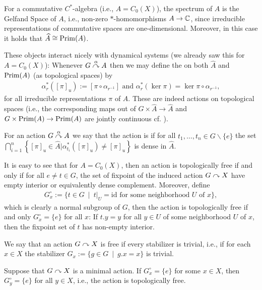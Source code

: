 \begin{remark}
	For a commutative $C^*$-algebra (i.e., $A = C_0(X)$), the spectrum of $A$ is the Gelfand Space of $A$, i.e., non-zero $*$-homomorphisms $A \to \mathbb{C}$, since irreducible representations of commutative spaces are one-dimensional. Moreover, in this case it holds that $\widehat{A} \cong \mathrm{Prim}(A)$.
\end{remark}
These objects interact nicely with dynamical systems (we already saw this for $A= C_0(X)$): Whenever $G \stackrel{\alpha}{\curvearrowright} A$ then we may define the  on both $\hat A$ and $\mathrm{Prim}(A)$ (as topological spaces) by
\begin{align*}
	\alpha_r^*([\pi]_u) := [\pi \circ \alpha_{r^{-1}}] \text{ and } \alpha_{r}^*(\ker \pi) = \ker \pi \circ \alpha_{r^{-1}},
\end{align*}
for all irreducible representations $\pi$ of $A$. These are indeed actions on topological spaces (i.e., the corresponding maps out of $G \times \hat A \to \hat A$ and $G \times \mathrm{Prim}(A) \to \mathrm{Prim}(A)$ are jointly continuous cf. \cite[Lemma 7.1]{williamsmorita}).
\begin{definition}
	For an action $G \stackrel{\alpha}{\curvearrowright} A$ we say that the action is  if for all $t_1,\dots,t_n \in G\backslash\{e\}$ the set $\bigcap_{i=1}^n \left\{ [\pi]_u \in \hat A | \alpha_{t_i}^*([\pi]_u)\neq [\pi]_u \right\}$ is dense in $\hat A$.
\end{definition}
\begin{remark}
	It is easy to see that for $A=C_0(X)$, then an action is topologically free if and only if for all $e \neq t \in G$, the set of fixpoint of the induced action $G \stackrel{}{\curvearrowright} X$ have empty interior or equivalently dense complement. Moreover, define 
	\begin{align*}
		G_x^\circ := \{t \in G \ \mid \ t|_U = \mathrm{id} \text{ for some neighborhood } U \text{ of } x\},
	\end{align*}
	which is clearly a normal subgroup of $G$, then the action is topologically free if and only $G_x^\circ = \{e\}$ for all $x$: If $t.y= y$ for all $y \in U$ of some neighborhood $U$ of $x$, then the fixpoint set of $t$ has non-empty interior.
\end{remark}
\begin{definition}
	We say that an action $G \stackrel{}{\curvearrowright} X$ is free if every stabilizer is trivial, i.e., if for each $x \in X$ the stabilizer $G_x :=\{g \in G \ \mid \ g.x =x\}$ is trivial.
\end{definition}
\begin{lemma}
	Suppose that $G \stackrel{}{\curvearrowright} X$ is a minimal action. If $G_x^\circ = \{e\}$ for some $x \in X$, then $G_y^\circ = \{e\}$ for all $y \in X$, i.e., the action is topologically free.
	\label{topfreeminimal}
\end{lemma}
